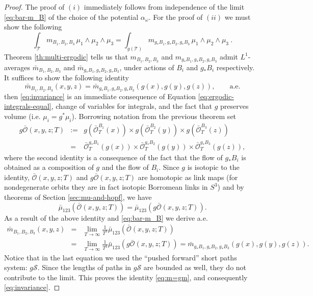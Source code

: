 \documentclass[12pt]{article}
\numberwithin{equation}{section}
\begin{document}
\begin{proof}%
The proof of $(i)$ immediately follows from independence of the limit \eqref{eq:bar-m_B}
of the choice of the potential $\alpha_\omega$.
For the proof of  $(ii)$ we must show the following
\[
 \int_\mathcal{T} m_{B_1,B_2,B_3}\,\mu_1\wedge \mu_2\wedge \mu_3=\int_{g(\mathcal{T})} m_{g_\ast B_1,g_\ast B_2, g_\ast B_3}\,\mu_1\wedge \mu_2\wedge \mu_3\ .
\]
Theorem \ref{th:multi-ergodic} tells us that $m_{B_1,B_2,B_3}$ and $m_{g_\ast B_1,g_\ast B_2, g_\ast B_3}$ admit $L^1$-averages $\bar{m}_{B_1,B_2,B_3}$ and $\bar{m}_{g_\ast B_1,g_\ast B_2, g_\ast B_3}$, under actions of $B_i$ and $g_\ast B_i$ respectively. It suffices to show the following identity
\begin{equation}\label{eq:m=gm}
 \bar{m}_{B_1,B_2,B_3}(x,y,z)=\bar{m}_{g_\ast B_1,g_\ast B_2, g_\ast B_3}(g(x),g(y),g(z)),\qquad \text{a.e.}
\end{equation}
then \eqref{eq:invariance} is an immediate consequence of Equation \eqref{eq:ergodic-integrals-equal}, change of variables for integrals, and the fact that $g$ preserves volume (i.e. $\mu_i=g^\ast\mu_i$).
Borrowing notation from the previous theorem set
\begin{eqnarray*}
 g\bar{\mathscr{O}}(x,y,z;T) & := & g(\bar{\mathscr{O}}^{B_1}_T(x))\times g(\bar{\mathscr{O}}^{B_2}_T(y))\times g(\bar{\mathscr{O}}^{B_3}_T(z))\\
 & = & \bar{\mathscr{O}}^{g_\ast B_1}_T(g(x))\times \bar{\mathscr{O}}^{g_\ast B_2}_T(g(y))\times \bar{\mathscr{O}}^{g_\ast B_3}_T(g(z)),
\end{eqnarray*}
where the second identity is a consequence of the fact that the flow of $g_\ast B_i$ is 
obtained as a composition of $g$ and the flow of $B_i$.
Since $g$ is isotopic to the identity, $\bar{\mathscr{O}}(x,y,z;T)$ and $g\bar{\mathscr{O}}(x,y,z;T)$
 are homotopic as link maps (for nondegenerate orbits they are in fact isotopic  Borromean links in $S^3$)
 and by theorems of Section \ref{sec:mu-and-hopf}, we have
 \[
  \bar{\mu}_{123}(\bar{\mathscr{O}}(x,y,z;T))=\bar{\mu}_{123}(g\bar{\mathscr{O}}(x,y,z;T)).
 \]
 As a result of the above identity and \eqref{eq:bar-m_B} we derive a.e.
\begin{eqnarray*}
  \bar{m}_{B_1,B_2,B_3}(x,y,z) & = & \lim_{T\to\infty}\frac{1}{T^3}\bar{\mu}_{123}(\bar{\mathscr{O}}(x,y,z;T))\\
   & = & \lim_{T\to\infty}\frac{1}{T^3}\bar{\mu}_{123}(g\bar{\mathscr{O}}(x,y,z;T))=\bar{m}_{g_\ast B_1,g_\ast B_2, g_\ast B_3}(g(x),g(y),g(z)).
\end{eqnarray*}
Notice that in the last equation we used the ``pushed forward'' short paths system: $g\mathcal{S}$.
Since the lengths of paths in $g\mathcal{S}$ are bounded as well, they do not contribute to the limit. This proves the identity \eqref{eq:m=gm}, and consequently \eqref{eq:invariance}.
\end{proof}
\end{document}
